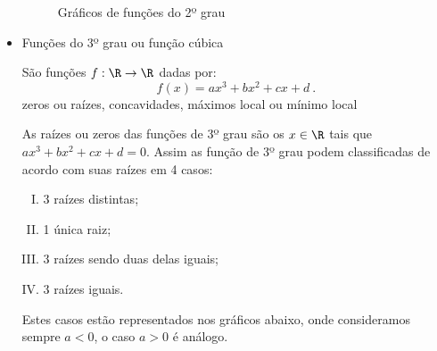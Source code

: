 \begin{itemize}
\begin{figure}[H]
   \caption{Gráficos de funções do 2º grau}
\end{figure}

  \newpage
 \item Funções do 3º grau ou função cúbica

 São funções $f: \R \rightarrow \R$ dadas por:
 \[f(x)= ax^3 + bx^2 + cx + d \ .\]
 {\color{red} zeros ou raízes, concavidades, máximos local ou mínimo local}

 As raízes ou zeros das funções de 3º grau são os $x \in \R$ tais que $ax^3 + bx^2 + cx + d=0$. Assim as função de 3º grau podem classificadas de acordo com suas raízes em 4 casos:
 \begin{enumerate}[(I)]
  \item 3 raízes distintas;
  \item 1 única raiz;
  \item 3 raízes sendo duas delas iguais;
  \item 3 raízes iguais.
 \end{enumerate}
 Estes casos estão representados nos gráficos abaixo, onde consideramos sempre $a< 0$, o caso $a> 0$ é análogo.



\end{itemize}
